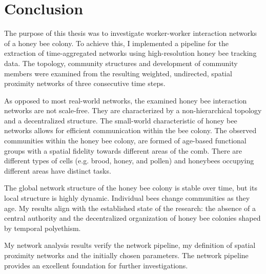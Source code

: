 \chapter{Conclusion}
\label{ch:conclusion}

The purpose of this thesis was to investigate worker-worker interaction networks of a honey bee colony.
To achieve this, I implemented a pipeline for the extraction of time-aggregated networks using high-resolution honey bee tracking data.
The topology, community structures and development of community members were examined from the resulting weighted, undirected, spatial proximity networks of three consecutive time steps.

As opposed to most real-world networks, the examined honey bee interaction networks are not scale-free.
They are characterized by a non-hierarchical topology and a decentralized structure.
The small-world characteristic of honey bee networks allows for efficient communication within the bee colony.
The observed communities within the honey bee colony, are formed of age-based functional groups with a spatial fidelity towards different areas of the comb.
There are different types of cells (e.g. brood, honey, and pollen) and honeybees occupying different areas have distinct tasks.

The global network structure of the honey bee colony is stable over time, but its local structure is highly dynamic.
Individual bees change communities as they age.
My results align with the established state of the research: the absence of a central authority and the decentralized organization of honey bee colonies shaped by temporal polyethism.

My network analysis results verify the network pipeline, my definition of spatial proximity networks and the initially chosen parameters.
The network pipeline provides an excellent foundation for further investigations.

